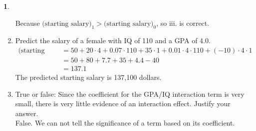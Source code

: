 \documentclass[12pt,fleqn]{article}\usepackage[]{graphicx}\usepackage[]{color}
\theoremstyle{definition}
\newtheorem{problem}{}
\begin{document}
\begin{problem}
\begin{enumerate}
  			  Because $\mbox{(starting salary)}_1 > \mbox{(starting salary)}_0$, so iii. is correct.
  			\item Predict the salary of a female with IQ of 110 and a GPA of 4.0.
  			  \begin{align*}
  			    \mbox{(starting salary)} &= 50 + 20\cdot 4 + 0.07\cdot 110 + 35\cdot 1 + 0.01\cdot 4 \cdot 110 + (-10) \cdot 4 \cdot 1\\
  			                             &= 50 + 80 + 7.7 + 35 + 4.4 - 40\\
  			                             &= 137.1
  			  \end{align*}
  			  The predicted starting salary is 137,100 dollars.
  			\item True or false: Since the coefficient for the GPA/IQ interaction term is very small, there is very little evidence of an interaction effect. Justify your answer.\\[5pt]
  			  False. We can not tell the significance of a term based on its coefficient.
			\end{enumerate}
	\end{problem}
	
\end{document}
